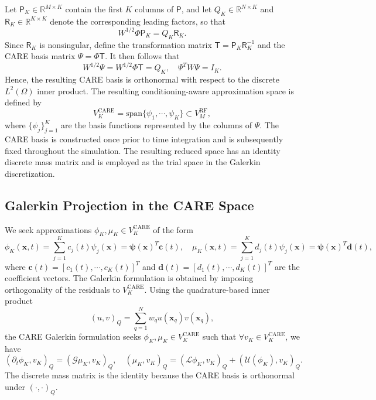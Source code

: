\documentclass[10pt,reqno]{amsart}
\theoremstyle{remark}
\theoremstyle{definition}
\begin{document}
Let $\mathsf{P}_K \in \mathbb{R}^{M \times K}$ contain the first $K$ columns of $\mathsf{P}$, and let $Q_K \in \mathbb{R}^{N \times K}$ and $\mathsf{R}_K \in \mathbb{R}^{K \times K}$ denote the corresponding leading factors, so that
$$
  W^{1/2} \Phi \mathsf{P}_K = Q_K \mathsf{R}_K.
$$
Since $\mathsf{R}_K$ is nonsingular, define the transformation matrix $\mathsf T = \mathsf{P}_K \mathsf{R}_K^{-1}$ and the CARE basis matrix $\Psi = \Phi \mathsf T$. It then follows that
$$
  W^{1/2} \Psi = W^{1/2} \Phi \mathsf T = Q_K, \quad \Psi ^{T} W \Psi = I_K.
$$
Hence, the resulting CARE basis is orthonormal with respect to the discrete $L^2(\Omega)$ inner product. The resulting conditioning-aware approximation space is defined by
\begin{equation}
  V_K^{\text{CARE}} = \mathrm{span}\{\psi_1,\cdots,\psi_K\} \subset V_M^{\text{RF}},
\end{equation}
where $\{\psi_j\}_{j=1}^K$ are the basis functions represented by the columns of $\Psi$. The CARE basis is constructed once prior to time integration and is subsequently fixed throughout the simulation. The resulting reduced space has an identity discrete mass matrix and is employed as the trial space in the Galerkin discretization.

\subsection{Galerkin Projection in the CARE Space}
We seek approximations $\phi_K , \mu_K \in V_K^{\text{CARE}}$ of the form
$$
  \phi _K(\boldsymbol{x},t) = \sum_{j=1}^{K} c_j(t) \psi_j(\boldsymbol{x}) = \boldsymbol{\psi}(\boldsymbol{x})^{T} \boldsymbol{c}(t), \quad \mu_K(\boldsymbol{x},t) = \sum_{j=1}^{K} d_j(t) \psi_j(\boldsymbol{x}) = \boldsymbol{\psi}(\boldsymbol{x})^{T} \boldsymbol{d}(t),
$$
where $\boldsymbol{c}(t) = [c_1(t), \cdots, c_K(t)]^{T}$ and $\boldsymbol{d}(t) = [d_1(t), \cdots, d_K(t)]^{T}$ are the coefficient vectors. The Galerkin formulation is obtained by imposing orthogonality of the residuals to $V_K^{\text{CARE}}$. Using the quadrature-based inner product
$$
  (u,v)_Q = \sum_{q=1}^{N} w_q u(\boldsymbol{x}_q) v(\boldsymbol{x}_q),
$$
the CARE Galerkin formulation seeks $\phi _ K ,\mu _K \in V_K^{\text{CARE}}$ such that $ \forall v_K \in V_K^{\text{CARE}}$, we have
\begin{equation}
  (\partial_t\phi_K,v_K)_Q=(\mathcal{G}\mu_K,v_K)_Q,\quad(\mu_K,v_K)_Q =(\mathcal{L}\phi_K,v_K)_Q + (\mathcal{U}(\phi_K),v_K)_Q.
\end{equation}
The discrete mass matrix is the identity because the CARE basis is orthonormal under $(\cdot,\cdot)_Q$.
\end{document}
